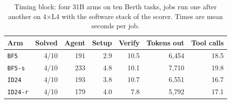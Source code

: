 \begin{table}[t]
\centering
\small
\caption{Timing block: four 31B arms on ten Berth tasks, jobs run one after another on 4$\times$L4 with the software stack of the scorer. Times are mean seconds per job.}
\label{tab:timing}
\begin{tabular}{lrrrrrr}
\toprule
Arm & Solved & Agent & Setup & Verify & Tokens out & Tool calls \\
\midrule
\texttt{BF5} & 4/10 & 191 & 2.9 & 10.5 & 6{,}454 & 18.5 \\
\texttt{BF5-s} & 4/10 & 233 & 4.8 & 10.1 & 7{,}710 & 19.8 \\
\texttt{ID24} & 4/10 & 193 & 3.8 & 10.7 & 6{,}551 & 16.7 \\
\texttt{ID24-r} & 4/10 & 179 & 4.0 & 7.8 & 5{,}792 & 17.1 \\
\bottomrule
\end{tabular}
\end{table}
